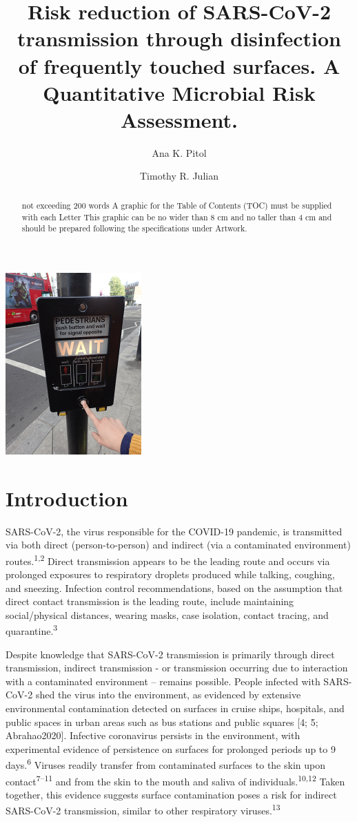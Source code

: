\documentclass[journal=jacsat,manuscript=article]{achemso}
\author{Ana K. Pitol}
\affiliation{Department of Civil and Environmental Engineering, Imperial College
London, United Kingdom}
\author{Timothy R. Julian}
\affiliation{Department of Environmental Microbiology, Eawag, Dubendorf, Switzerland}
\title[An \textsf{achemso} demo]{Risk reduction of SARS-CoV-2 transmission through disinfection of
frequently touched surfaces. A Quantitative Microbial Risk Assessment.}
\begin{document}
\begin{abstract}
not exceeding 200 words A graphic for the Table of Contents (TOC) must
be supplied with each Letter This graphic can be no wider than 8 cm and
no taller than 4 cm and should be prepared following the specifications
under Artwork.
\end{abstract}
\begin{tocentry}
\includegraphics{Risk-reduction-of-SARS-CoV-2-by-disinfection-of-surfaces-and-hands_files/figure-latex/TOC.pdf}
\end{tocentry}

\hypertarget{introduction}{%
\section{Introduction}\label{introduction}}

SARS-CoV-2, the virus responsible for the COVID-19 pandemic, is
transmitted via both direct (person-to-person) and indirect (via a
contaminated environment) routes.\textsuperscript{1,2} Direct
transmission appears to be the leading route and occurs via prolonged
exposures to respiratory droplets produced while talking, coughing, and
sneezing. Infection control recommendations, based on the assumption
that direct contact transmission is the leading route, include
maintaining social/physical distances, wearing masks, case isolation,
contact tracing, and quarantine.\textsuperscript{3}

Despite knowledge that SARS-CoV-2 transmission is primarily through
direct transmission, indirect transmission - or transmission occurring
due to interaction with a contaminated environment -- remains possible.
People infected with SARS-CoV-2 shed the virus into the environment, as
evidenced by extensive environmental contamination detected on surfaces
in cruise ships, hospitals, and public spaces in urban areas such as bus
stations and public squares {[}4; 5; Abrahao2020{]}. Infective
coronavirus persists in the environment, with experimental evidence of
persistence on surfaces for prolonged periods up to 9
days.\textsuperscript{6} Viruses readily transfer from contaminated
surfaces to the skin upon contact\textsuperscript{7--11} and from the
skin to the mouth and saliva of individuals.\textsuperscript{10,12}
Taken together, this evidence suggests surface contamination poses a
risk for indirect SARS-CoV-2 transmission, similar to other respiratory
viruses.\textsuperscript{13}
\end{document}
